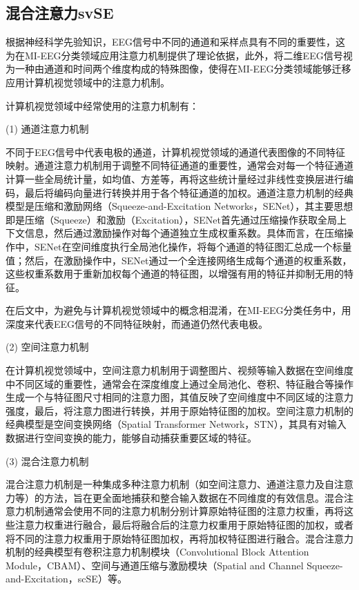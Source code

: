 \subsection{混合注意力svSE}

根据神经科学先验知识，EEG信号中不同的通道和采样点具有不同的重要性，这为在MI-EEG分类领域应用注意力机制提供了理论依据，此外，将二维EEG信号视为一种由通道和时间两个维度构成的特殊图像，使得在MI-EEG分类领域能够迁移应用计算机视觉领域中的注意力机制。

计算机视觉领域中经常使用的注意力机制有：

(1) 通道注意力机制
    
不同于EEG信号中代表电极的通道，计算机视觉领域的通道代表图像的不同特征映射。通道注意力机制用于调整不同特征通道的重要性，通常会对每一个特征通道计算一些全局统计量，如均值、方差等，再将这些统计量经过非线性变换层进行编码，最后将编码向量进行转换并用于各个特征通道的加权。通道注意力机制的经典模型是压缩和激励网络（Squeeze-and-Excitation Networks，SENet）\cite{8578843}，其主要思想即是压缩（Squeeze）和激励（Excitation），SENet首先通过压缩操作获取全局上下文信息，然后通过激励操作对每个通道独立生成权重系数。具体而言，在压缩操作中，SENet在空间维度执行全局池化操作，将每个通道的特征图汇总成一个标量值；然后，在激励操作中，SENet通过一个全连接网络生成每个通道的权重系数，这些权重系数用于重新加权每个通道的特征图，以增强有用的特征并抑制无用的特征。

在后文中，为避免与计算机视觉领域中的概念相混淆，在MI-EEG分类任务中，用深度来代表EEG信号的不同特征映射，而通道仍然代表电极。

(2) 空间注意力机制
    
在计算机视觉领域中，空间注意力机制用于调整图片、视频等输入数据在空间维度中不同区域的重要性，通常会在深度维度上通过全局池化、卷积、特征融合等操作生成一个与特征图尺寸相同的注意力图，其值反映了空间维度中不同区域的注意力强度，最后，将注意力图进行转换，并用于原始特征图的加权。空间注意力机制的经典模型是空间变换网络（Spatial Transformer Network，STN）\cite{jaderberg2015spatial}，其具有对输入数据进行空间变换的能力，能够自动捕获重要区域的特征。

(3) 混合注意力机制
    
混合注意力机制是一种集成多种注意力机制（如空间注意力、通道注意力及自注意力等）的方法，旨在更全面地捕获和整合输入数据在不同维度的有效信息。混合注意力机制通常会使用不同的注意力机制分别计算原始特征图的注意力权重，再将这些注意力权重进行融合，最后将融合后的注意力权重用于原始特征图的加权，或者将不同的注意力权重用于原始特征图加权，再将加权特征图进行融合。混合注意力机制的经典模型有卷积注意力机制模块（Convolutional Block Attention Module，CBAM）\cite{woo2018cbam}、空间与通道压缩与激励模块（Spatial and Channel Squeeze-and-Excitation，scSE）\cite{roy2018concurrent}等。
    

